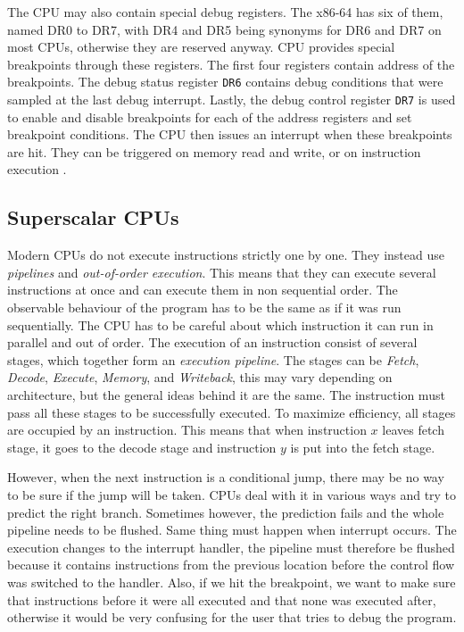 The CPU may also contain special debug registers. The x86-64 has six of them,
named DR0 to DR7, with DR4 and DR5 being synonyms for DR6 and DR7 on most CPUs,
otherwise they are reserved anyway. CPU provides special breakpoints through
these registers. The first four registers contain address of the breakpoints.
The debug status register \texttt{DR6} contains debug conditions that were
sampled at the last debug interrupt. Lastly, the debug control register
\texttt{DR7} is used to enable and disable breakpoints for each of the address
registers and set breakpoint conditions. The CPU then issues an interrupt when
these breakpoints are hit. They can be triggered on memory read and write, or
on instruction execution \cite{intel-manual}.

\subsection{Superscalar CPUs}
Modern CPUs do not execute instructions strictly one by one. They instead use
\textit{pipelines} and \textit{out-of-order execution}. This means that they
can execute several instructions at once and can execute them in non sequential
order. The observable behaviour of the program has to be the same as if it was
run sequentially. The CPU has to be careful about which instruction it can run
in parallel and out of order. The execution of an instruction consist of
several stages, which together form an \textit{execution pipeline}. The stages
can be \textit{Fetch}, \textit{Decode}, \textit{Execute}, \textit{Memory}, and
\textit{Writeback}, this may vary depending on architecture, but the general
ideas behind it are the same. The instruction must pass all these stages to be
successfully executed. To maximize efficiency, all stages are occupied by an
instruction. This means that when instruction $x$ leaves fetch stage, it goes
to the decode stage and instruction $y$ is put into the fetch stage.

However, when the next instruction is a conditional jump, there may be no way
to be sure if the jump will be taken.  CPUs deal with it in various ways and
try to predict the right branch. Sometimes however, the prediction fails and
the whole pipeline needs to be flushed. Same thing must happen when interrupt
occurs. The execution changes to the interrupt handler, the pipeline must
therefore be flushed because it contains instructions from the previous
location before the control flow was switched to the handler. Also, if we hit
the breakpoint, we want to make sure that instructions before it were all
executed and that none was executed after, otherwise it would be very confusing
for the user that tries to debug the program.

